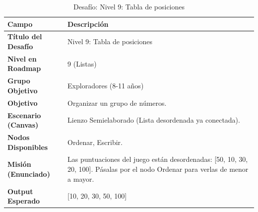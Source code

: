 \begin{table}[H]
    \centering
    \caption{Desafío: Nivel 9: Tabla de posiciones}
    \label{tab:desafio-exp-9}
    \begingroup
    \renewcommand{\arraystretch}{\TableRowStretch}
    \begin{tabularx}{\textwidth}{ l X }
        \hline
        \textbf{Campo}              & \textbf{Descripción}                                                                                                            \\
        \hline
        \textbf{Título del Desafío} & Nivel 9: Tabla de posiciones                                                                                                    \\
        \textbf{Nivel en Roadmap}   & 9 (Listas)                                                                                                                      \\
        \textbf{Grupo Objetivo}     & Exploradores (8-11 años)                                                                                                        \\
        \textbf{Objetivo}           & Organizar un grupo de números.                                                                                                  \\
        \textbf{Escenario (Canvas)} & Lienzo Semielaborado (Lista desordenada ya conectada).                                                                          \\
        \textbf{Nodos Disponibles}  & Ordenar, Escribir.                                                                                                              \\
        \textbf{Misión (Enunciado)} & Las puntuaciones del juego están desordenadas: [50, 10, 30, 20, 100]. Pásalas por el nodo Ordenar para verlas de menor a mayor. \\
        \textbf{Output Esperado}    & [10, 20, 30, 50, 100]                                                                                                           \\
        \hline
    \end{tabularx}
    \endgroup
\end{table}


